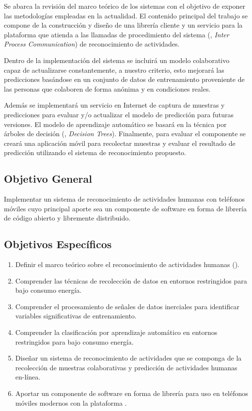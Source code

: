 Se abarca la revisión del marco teórico de los sistemas 
con el objetivo de exponer las metodologías empleadas en la actualidad.
El contenido principal del trabajo se compone de la construcción y
diseño de una librería cliente y un servicio para la plataforma \emph{}
que atienda a las llamadas de procedimiento del sistema (,
\emph{Inter Process Communication}) de reconocimiento de actividades. 

Dentro de la implementación del sistema  se incluirá un
modelo colaborativo capaz de actualizarse constantemente, a nuestro
criterio, esto mejorará las predicciones basándose en un conjunto
de datos de entrenamiento proveniente de las personas que colaboren
de forma anónima y en condiciones reales.

Además se implementará un servicio en Internet de captura de muestras
y predicciones para evaluar y/o actualizar el modelo de predicción
para futuras versiones. El modelo de aprendizaje automático se basará
en la técnica por árboles de decisión (, \emph{Decision
Trees}). Finalmente, para evaluar el componente se creará una aplicación
móvil para recolectar muestras y evaluar el resultado de predicción
utilizando el sistema de reconocimiento propuesto.

\subsection{Objetivo General}

\label{sec13:objetivo-general}

Implementar un sistema de reconocimiento de actividades humanas con
teléfonos móviles cuyo principal aporte sea un componente de software
en forma de librería de código abierto y libremente distribuido.

\subsection{Objetivos Específicos}

\label{sec13:objetivos-especuxedficos}
\begin{enumerate}
\item \label{enu:obe1}Definir el marco teórico sobre el reconocimiento
de actividades humanas (). 
\item \label{enu:obe2}Comprender las técnicas de recolección de datos en
entornos restringidos para bajo consumo energía. 
\item \label{enu:obe3}Comprender el procesamiento de señales de datos inerciales
para identificar variables significativas de entrenamiento. 
\item \label{enu:obe4}Comprender la clasificación por aprendizaje automático
en entornos restringidos para bajo consumo energía. 
\item \label{enu:obe5}Diseñar un sistema de reconocimiento de actividades
que se componga de la recolección de muestras colaborativas y predicción
de actividades humanas en-línea. 
\item \label{enu:obe6}Aportar un componente de software en forma de librería
para uso en teléfonos móviles modernos con la plataforma . 
\end{enumerate}

